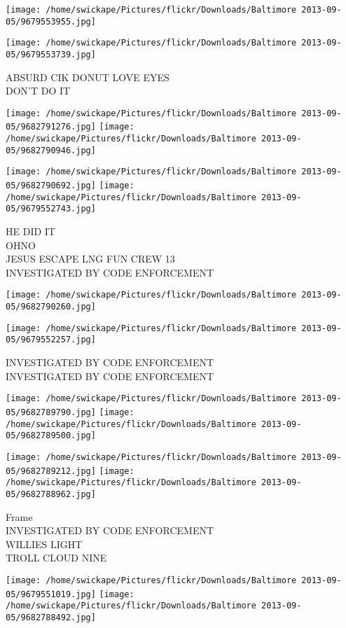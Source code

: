 \documentclass[10pt,letterpaper]{article}
\begin{document}
\texttt{[image: /home/swickape/Pictures/flickr/Downloads/Baltimore 2013-09-05/9679553955.jpg]}

\vspace{0.25in}
\texttt{[image: /home/swickape/Pictures/flickr/Downloads/Baltimore 2013-09-05/9679553739.jpg]}

ABSURD CIK DONUT LOVE EYES\\
DON'T DO IT
\pagebreak

\texttt{[image: /home/swickape/Pictures/flickr/Downloads/Baltimore 2013-09-05/9682791276.jpg]}
\texttt{[image: /home/swickape/Pictures/flickr/Downloads/Baltimore 2013-09-05/9682790946.jpg]}

\texttt{[image: /home/swickape/Pictures/flickr/Downloads/Baltimore 2013-09-05/9682790692.jpg]}
\texttt{[image: /home/swickape/Pictures/flickr/Downloads/Baltimore 2013-09-05/9679552743.jpg]}

HE DID IT\\
OHNO\\
JESUS ESCAPE LNG FUN CREW 13\\
INVESTIGATED BY CODE ENFORCEMENT
\pagebreak

\texttt{[image: /home/swickape/Pictures/flickr/Downloads/Baltimore 2013-09-05/9682790260.jpg]}

\vspace{0.25in}
\texttt{[image: /home/swickape/Pictures/flickr/Downloads/Baltimore 2013-09-05/9679552257.jpg]}

INVESTIGATED BY CODE ENFORCEMENT\\
INVESTIGATED BY CODE ENFORCEMENT
\pagebreak

\texttt{[image: /home/swickape/Pictures/flickr/Downloads/Baltimore 2013-09-05/9682789790.jpg]}
\texttt{[image: /home/swickape/Pictures/flickr/Downloads/Baltimore 2013-09-05/9682789500.jpg]}

\texttt{[image: /home/swickape/Pictures/flickr/Downloads/Baltimore 2013-09-05/9682789212.jpg]}
\texttt{[image: /home/swickape/Pictures/flickr/Downloads/Baltimore 2013-09-05/9682788962.jpg]}

Frame\\
INVESTIGATED BY CODE ENFORCEMENT\\
WILLIES LIGHT\\
TROLL CLOUD NINE
\pagebreak

\texttt{[image: /home/swickape/Pictures/flickr/Downloads/Baltimore 2013-09-05/9679551019.jpg]}
\texttt{[image: /home/swickape/Pictures/flickr/Downloads/Baltimore 2013-09-05/9682788492.jpg]}
\end{document}
